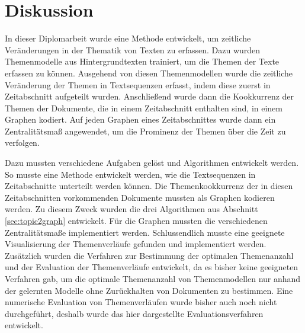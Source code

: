 \chapter{Diskussion}

In dieser Diplomarbeit wurde eine Methode entwickelt, um zeitliche Veränderungen in der Thematik von Texten zu erfassen. Dazu wurden Themenmodelle aus Hintergrundtexten trainiert, um die Themen der Texte erfassen zu können. Ausgehend von diesen Themenmodellen wurde die zeitliche Veränderung der Themen in Textsequenzen erfasst, indem diese zuerst in Zeitabschnitt aufgeteilt wurden. Anschließend wurde dann die Kookkurrenz der Themen der Dokumente, die in einem Zeitabschnitt enthalten sind, in einem Graphen kodiert. Auf jeden Graphen eines Zeitabschnittes wurde dann ein Zentralitätsmaß angewendet, um die Prominenz der Themen über die Zeit zu verfolgen. 

Dazu mussten verschiedene Aufgaben gelöst und Algorithmen entwickelt werden. So musste eine Methode entwickelt werden, wie die Textsequenzen in Zeitabschnitte unterteilt werden können. Die Themenkookkurrenz der in diesen Zeitabschnitten vorkommenden Dokumente mussten als Graphen kodieren werden. Zu diesem Zweck wurden die drei Algorithmen aus Abschnitt \ref{sec:topic2graph} entwickelt. Für die Graphen mussten die verschiedenen Zentralitätsmaße implementiert werden. Schlussendlich musste eine geeignete Visualisierung der Themenverläufe gefunden und implementiert werden. 
Zusätzlich wurden die Verfahren zur Bestimmung der optimalen Themenanzahl und der Evaluation der Themenverläufe entwickelt, da es bisher keine geeigneten Verfahren gab, um die optimale Themenanzahl von Themenmodellen nur anhand der gelernten Modelle ohne Zurückhalten von Dokumenten zu bestimmen. Eine numerische Evaluation von Themenverläufen wurde bisher auch noch nicht durchgeführt, deshalb wurde das hier dargestellte Evaluationsverfahren entwickelt.

